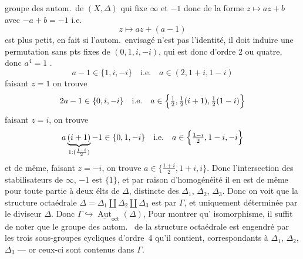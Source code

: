\documentclass[11pt,a4paper]{article}
\begin{document}
groupe des autom.\ de $(X, \Delta)$ qui fixe $\infty$ et $-1$ donc
 de la forme $z \mapsto az + b$ avec $-a + b = -1$ i.e.
\[
  z \longmapsto az + (a-1)
\]
est plus petit, en fait si l'autom.\ envisagé n'est pas l'identité, il doit
induire une permutation sans pts fixes de $(0, 1, i, -i)$, qui est donc d'ordre
2 ou quatre, donc  $a^4 = 1$ .  
\[
  a - 1 \in \{1, i, -i\} \quad \text{i.e.}\quad a \in (2, 1+i, 1-i)
\]
faisant $z = 1$ on trouve
\[
  2a - 1 \in \{0, i, -i\} \quad \text{i.e.}\quad
  a \in \Bigl\{\tfrac12, \tfrac12 (i+1), \tfrac12 (1-i)\Bigr\}
\]
faisant $z = i$, on trouve
\[
  a\underbrace{(i+1)}_{1 : (\frac{1-i}{2})} - 1 \in \{0, 1, -i\}
  \quad \text{i.e.}\quad a \in \Bigl\{\tfrac{1-i}{2}, 1-i, -i\Bigr\}
\]
et de même, faisant $z = -i$, on trouve $a \in \bigl\{\frac{1+i}{2}, 1+i, i\bigr\}$.
Donc l'intersection des stabilisateurs de $\infty$, $-1$ est $\{1\}$, et par
raison d'homogénéité il en est de même pour toute partie à deux élts de
$\Delta$, distincte des $\Delta_1$, $\Delta_2$, $\Delta_3$. Donc on voit que la
structure octaédrale $\Delta = \Delta_1 \amalg \Delta_2 \amalg \Delta_3$ est
 par $\Gamma$, et uniquement déterminée par le diviseur
$\Delta$. Donc $\Gamma \hookrightarrow \underline{\operatorname{Aut}}_{\mathrm{oct}}(\Delta)$,
Pour montrer qu' isomorphisme, il suffit de noter que le groupe des
autom.\  de la structure octaédrale est engendré par les trois
sous-groupes cycliques d'ordre~4 \struck{\ill{}} qu'il contient,
correspondants à $\Delta_1$, $\Delta_2$, $\Delta_3$
--- or ceux-ci sont contenus dans $\Gamma$.
\end{document}
